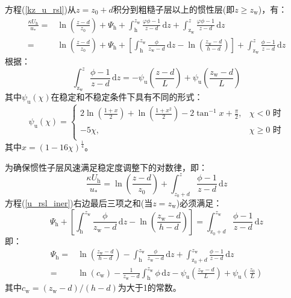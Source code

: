 方程(\ref{kz_u_rsl})从$z=z_0+d$积分到粗糙子层以上的惯性层(即$z\geqslant z_{\mathrm{w}}$)，有：
\begin{align}\label{u_rsl_iner}
  \frac{\kappa U_{\mathrm{h}}}{u_{*}} =& \ln \left(\frac{z-d}{z_{0}}\right) + \Psi_{\mathrm{h}} + \int_{\mathrm{h}}^{z_{\mathrm{w}}} \frac{\varphi \phi - 1}{z-d} \,{\mathrm d}z
  + \int_{\mathrm{z_{w}}}^{z} \frac{\varphi \phi - 1}{z-d} \,{\mathrm d}z \nonumber \\[1ex]
  =& \ln \left(\frac{z-d}{z_{0}}\right) + \Psi_{\mathrm{h}} + \left[\int_{\mathrm{h}}^{z_{\mathrm{w}}} \frac{\phi}{z_{\mathrm{w}}-d} \,{\mathrm d}z - \ln \left(\frac{z_{\mathrm{w}}-d}{h-d}\right) \right]
  + \int_{\mathrm{z_{w}}}^{z} \frac{\phi - 1}{z-d} \,{\mathrm d}z
\end{align}
根据\citet{Garratt1992TheAB}：
\begin{equation}
  \int_{\mathrm{z_{w}}}^{z} \frac{\phi - 1}{z-d} \,{\mathrm d}z = -\psi_{\mathrm {u}} \left(\frac{z-d}{L} \right) + \psi_{\mathrm {u}} \left(\frac{z_{\mathrm{w}}-d}{L} \right)
\end{equation}
其中$\psi_{\mathrm {u}}(\chi )$在稳定和不稳定条件下具有不同的形式：
\begin{equation}
  \psi_{\mathrm {u}}(\chi ) = \begin{cases}
    2\ln \left(\frac{1+x}{2} \right) + \ln \left(\frac{1+x^2}{2} \right) - 2\tan^{-1}x + \frac {\pi}{2}, & \chi<0 \text { 时} \\[1ex]
    -5\chi, & \chi \geqslant 0 \text { 时} \\
  \end{cases}
\end{equation}
其中$x=(1-16\chi)^{\frac{1}{4}}$。

为确保惯性子层风速满足稳定度调整下的对数律，即：
\begin{equation}\label{u_iner}
  \frac{\kappa U_{\mathrm{h}}}{u_{*}} = \ln \left(\frac{z-d}{z_{0}}\right) + \int_{z_{0}+d}^{z} \frac{\phi - 1}{z-d} \,{\mathrm d}z
\end{equation}
方程(\ref{u_rsl_iner})右边最后三项之和(当$z=z_{\mathrm{w}}$)必须满足：
\begin{equation}
  \Psi_{\mathrm{h}} + \left[\int_{\mathrm{h}}^{z_{\mathrm{w}}} \frac{\phi}{z_{\mathrm{w}}-d} \,{\mathrm d}z - \ln \left(\frac{z_{\mathrm{w}}-d}{h-d}\right) \right] = \int_{\mathrm{z_{0}}+d}^{z_{\mathrm{w}}} \frac{\phi - 1}{z-d} \,{\mathrm d}z
\end{equation}
即：
\begin{align}\label{Psih_general}
  \Psi_{\mathrm{h}} =& \ln \left(\frac{z_{\mathrm{w}}-d}{h-d}\right) - \int_{\mathrm{h}}^{z_{\mathrm{w}}} \frac{\phi}{z_{\mathrm{w}}-d} \,{\mathrm d}z
  + \int_{\mathrm{z_{0}}+d}^{z_{\mathrm{w}}} \frac{\phi - 1}{z-d} \,{\mathrm d}z \nonumber \\[1.5ex]
  =& \ln \left(c_{\mathrm{w}}\right) -\frac{1}{z_{\mathrm{w}}-d} \int_{\mathrm{h}}^{z_{\mathrm{w}}} \phi \,{\mathrm d}z - \psi_{\mathrm {u}} \left(\frac{z_{\mathrm{w}}-d}{L} \right)
  + \psi_{\mathrm {u}} \left(\frac{z_{0}}{L} \right)
\end{align}
其中$c_{\mathrm{w}}=(z_{\mathrm{w}}-d)/(h-d)$为大于1的常数。

